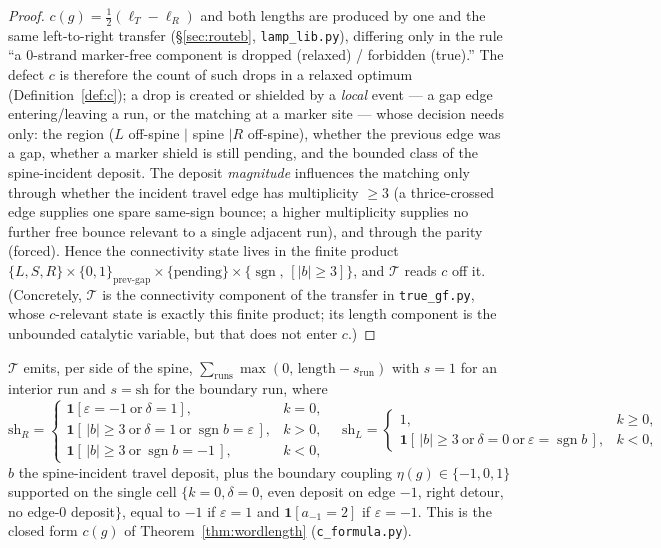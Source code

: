 \begin{proof}
$c(g)=\tfrac12(\ell_T-\ell_R)$ and both lengths are produced by one and the same left-to-right
transfer (\S\ref{sec:routeb}, \texttt{lamp\_lib.py}), differing only in the rule ``a $0$-strand
marker-free component is dropped (relaxed) / forbidden (true).'' The defect $c$ is therefore the count
of such drops in a relaxed optimum (Definition~\ref{def:c}); a drop is created or shielded by a
\emph{local} event — a gap edge entering/leaving a run, or the matching at a marker site — whose
decision needs only: the region ($L$ off-spine $\mid$ spine $\mid R$ off-spine), whether the previous
edge was a gap, whether a marker shield is still pending, and the bounded class of the
spine-incident deposit. The deposit \emph{magnitude} influences the matching only through whether the
incident travel edge has multiplicity $\ge3$ (a thrice-crossed edge supplies one spare same-sign
bounce; a higher multiplicity supplies no further free bounce relevant to a single adjacent run), and
through the parity (forced). Hence the connectivity state lives in the finite product
$\{L,S,R\}\times\{0,1\}_{\text{prev-gap}}\times\{\text{pending}\}\times
\{\operatorname{sgn},\,[|b|{\ge}3]\}$, and $\mathcal T$ reads $c$ off it. (Concretely, $\mathcal T$ is
the connectivity component of the transfer in \texttt{true\_gf.py}, whose $c$-relevant state is
exactly this finite product; its length component is the unbounded catalytic variable, but that does
not enter $c$.) \end{proof}

\begin{proposition}\label{prop:Tform}
$\mathcal T$ emits, per side of the spine, $\sum_{\text{runs}}\max(0,\,\text{length}-s_{\text{run}})$
with $s=1$ for an interior run and $s=\mathrm{sh}$ for the boundary run, where
\[
\mathrm{sh}_R=\begin{cases}
\mathbf 1[\varepsilon=-1\ \text{or}\ \delta=1], & k=0,\\
\mathbf 1[\,|b|\ge3\ \text{or}\ \delta=1\ \text{or}\ \operatorname{sgn}b=\varepsilon\,], & k>0,\\
\mathbf 1[\,|b|\ge3\ \text{or}\ \operatorname{sgn}b=-1\,], & k<0,
\end{cases}
\quad
\mathrm{sh}_L=\begin{cases}1,&k\ge0,\\
\mathbf 1[\,|b|\ge3\ \text{or}\ \delta=0\ \text{or}\ \varepsilon=\operatorname{sgn}b\,],&k<0,\end{cases}
\]
$b$ the spine-incident travel deposit, plus the boundary coupling $\eta(g)\in\{-1,0,1\}$ supported on
the single cell $\{k=0,\delta=0$, even deposit on edge $-1$, right detour, no edge-$0$ deposit$\}$,
equal to $-1$ if $\varepsilon=1$ and $\mathbf 1[a_{-1}=2]$ if $\varepsilon=-1$. This is the closed form
$c(g)$ of Theorem~\ref{thm:wordlength} (\texttt{c\_formula.py}).
\end{proposition}

